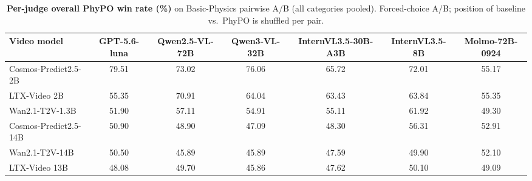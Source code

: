 \begin{table}[t]
\centering
\footnotesize
\setlength{\tabcolsep}{4pt}
\caption{\textbf{Per-judge overall PhyPO win rate (\%)} on Basic-Physics pairwise A/B (all categories pooled).
Forced-choice A/B; position of baseline vs.\ PhyPO is shuffled per pair.}
\label{tab:phypo-vlm-per-judge}
\begin{tabular}{lcccccc}
\toprule
Video model
  & GPT-5.6-luna
  & Qwen2.5-VL-72B
  & Qwen3-VL-32B
  & InternVL3.5-30B-A3B
  & InternVL3.5-8B
  & Molmo-72B-0924 \\
\midrule
Cosmos-Predict2.5-2B  & 79.51 & 73.02 & 76.06 & 65.72 & 72.01 & 55.17 \\
LTX-Video 2B          & 55.35 & 70.91 & 64.04 & 63.43 & 63.84 & 55.35 \\
Wan2.1-T2V-1.3B       & 51.90 & 57.11 & 54.91 & 55.11 & 61.92 & 49.30 \\
Cosmos-Predict2.5-14B & 50.90 & 48.90 & 47.09 & 48.30 & 56.31 & 52.91 \\
Wan2.1-T2V-14B        & 50.50 & 45.89 & 45.89 & 47.59 & 49.90 & 52.10 \\
LTX-Video 13B         & 48.08 & 49.70 & 45.86 & 47.62 & 50.10 & 49.09 \\
\bottomrule
\end{tabular}
\end{table}
